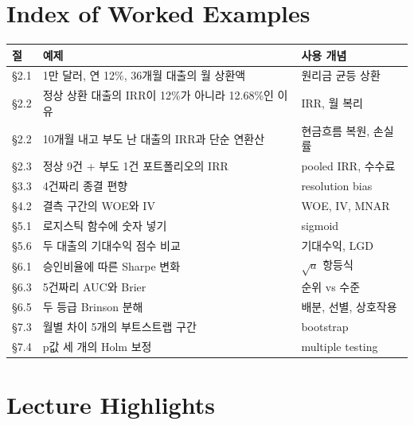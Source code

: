 \chapter*{Index of Worked Examples}
{\small
\begin{longtable}{@{}p{12mm}p{80mm}p{60mm}@{}}\toprule
절 & 예제 & 사용 개념\\\midrule\endhead
\S2.1 & 1만 달러, 연 12\%, 36개월 대출의 월 상환액 & 원리금 균등 상환\\
\S2.2 & 정상 상환 대출의 IRR이 12\%가 아니라 12.68\%인 이유 & IRR, 월 복리\\
\S2.2 & 10개월 내고 부도 난 대출의 IRR과 단순 연환산 & 현금흐름 복원, 손실률\\
\S2.3 & 정상 9건 + 부도 1건 포트폴리오의 IRR & pooled IRR, 수수료\\
\S3.3 & 4건짜리 종결 편향 & resolution bias\\
\S4.2 & 결측 구간의 WOE와 IV & WOE, IV, MNAR\\
\S5.1 & 로지스틱 함수에 숫자 넣기 & sigmoid\\
\S5.6 & 두 대출의 기대수익 점수 비교 & 기대수익, LGD\\
\S6.1 & 승인비율에 따른 Sharpe 변화 & $\sqrt{a}$ 항등식\\
\S6.3 & 5건짜리 AUC와 Brier & 순위 vs 수준\\
\S6.5 & 두 등급 Brinson 분해 & 배분, 선별, 상호작용\\
\S7.3 & 월별 차이 5개의 부트스트랩 구간 & bootstrap\\
\S7.4 & p값 세 개의 Holm 보정 & multiple testing\\\bottomrule
\end{longtable}}

\chapter*{Lecture Highlights}

